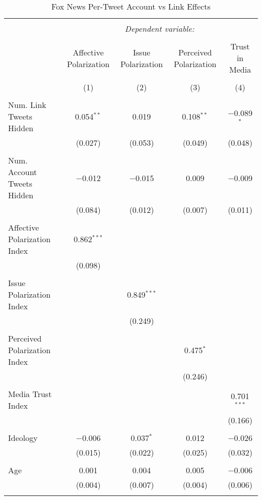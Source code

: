 
\begin{table}[!htbp] \centering 
  \caption{Fox News Per-Tweet Account vs Link Effects} 
  \label{} 
\tiny 
\begin{tabular}{@{\extracolsep{5pt}}lcccc} 
\\[-1.8ex]\hline 
\hline \\[-1.8ex] 
 & \multicolumn{4}{c}{\textit{Dependent variable:}} \\ 
\cline{2-5} 
\\[-1.8ex] & Affective Polarization & Issue Polarization & Perceived Polarization & Trust in Media \\ 
\\[-1.8ex] & (1) & (2) & (3) & (4)\\ 
\hline \\[-1.8ex] 
 Num. Link Tweets Hidden & 0.054$^{**}$ & 0.019 & 0.108$^{**}$ & $-$0.089$^{*}$ \\ 
  & (0.027) & (0.053) & (0.049) & (0.048) \\ 
  & & & & \\ 
 Num. Account Tweets Hidden & $-$0.012 & $-$0.015 & 0.009 & $-$0.009 \\ 
  & (0.084) & (0.012) & (0.007) & (0.011) \\ 
  & & & & \\ 
 Affective Polarization Index & 0.862$^{***}$ &  &  &  \\ 
  & (0.098) &  &  &  \\ 
  & & & & \\ 
 Issue Polarization Index &  & 0.849$^{***}$ &  &  \\ 
  &  & (0.249) &  &  \\ 
  & & & & \\ 
 Perceived Polarization Index &  &  & 0.475$^{*}$ &  \\ 
  &  &  & (0.246) &  \\ 
  & & & & \\ 
 Media Trust Index &  &  &  & 0.701$^{***}$ \\ 
  &  &  &  & (0.166) \\ 
  & & & & \\ 
 Ideology & $-$0.006 & 0.037$^{*}$ & 0.012 & $-$0.026 \\ 
  & (0.015) & (0.022) & (0.025) & (0.032) \\ 
  & & & & \\ 
 Age & 0.001 & 0.004 & 0.005 & $-$0.006 \\ 
  & (0.004) & (0.007) & (0.004) & (0.006) \\ 
  & & & & \\ 

\end{tabular}
\end{table}
